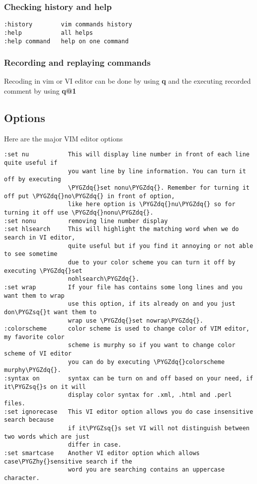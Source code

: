 \documentclass[letterpaper,10pt,english]{sphinxmanual}
\def\PYGZhy{\char`\-}
\def\PYGZsq{\char`\'}
\def\PYGZdq{\char`\"}
\renewcommand\PYGZsq{\textquotesingle}
\begin{document}
\subsubsection{Checking history and help}
\label{editor/vim:checking-history-and-help}
\begin{Verbatim}[commandchars=\\\{\}]
:history        vim commands history
:help           all helps
:help command   help on one command
\end{Verbatim}


\subsubsection{Recording and replaying commands}
\label{editor/vim:recording-and-replaying-commands}
Recoding in vim or VI editor can be done by using \textbf{q} and the executing recorded comment by using \textbf{q@1}


\subsection{Options}
\label{editor/vim:options}
Here are the major VIM editor options

\begin{Verbatim}[commandchars=\\\{\}]
:set nu           This will display line number in front of each line quite useful if
                  you want line by line information. You can turn it off by executing
                  \PYGZdq{}set nonu\PYGZdq{}. Remember for turning it off put \PYGZdq{}no\PYGZdq{} in front of option,
                  like here option is \PYGZdq{}nu\PYGZdq{} so for turning it off use \PYGZdq{}nonu\PYGZdq{}.
:set nonu         removing line number display
:set hlsearch     This will highlight the matching word when we do search in VI editor,
                  quite useful but if you find it annoying or not able to see sometime
                  due to your color scheme you can turn it off by executing \PYGZdq{}set
                  nohlsearch\PYGZdq{}.
:set wrap         If your file has contains some long lines and you want them to wrap
                  use this option, if its already on and you just don\PYGZsq{}t want them to
                  wrap use \PYGZdq{}set nowrap\PYGZdq{}.
:colorscheme      color scheme is used to change color of VIM editor, my favorite color
                  scheme is murphy so if you want to change color scheme of VI editor
                  you can do by executing \PYGZdq{}colorscheme murphy\PYGZdq{}.
:syntax on        syntax can be turn on and off based on your need, if it\PYGZsq{}s on it will
                  display color syntax for .xml, .html and .perl files.
:set ignorecase   This VI editor option allows you do case insensitive search because
                  if it\PYGZsq{}s set VI will not distinguish between two words which are just
                  differ in case.
:set smartcase    Another VI editor option which allows case\PYGZhy{}sensitive search if the
                  word you are searching contains an uppercase character.
\end{Verbatim}
\end{document}
